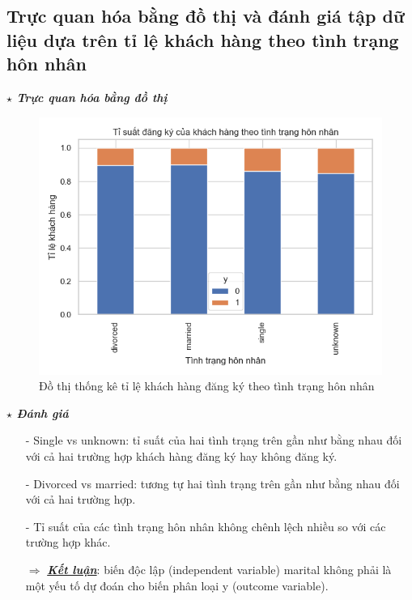\documentclass{report}
\begin{document}
        \pagebreak
    
        \subsection{Trực quan hóa bằng đồ thị và đánh giá tập dữ liệu dựa trên tỉ lệ khách hàng theo tình trạng hôn nhân}
            \fontsize{13}{10}\selectfont \textbf{$\star$\textit{ Trực quan hóa bằng đồ thị}}
                \begin{figure}[htp]
                    \centering
                    \includegraphics[scale = 0.8]{image/frequency_mariral.png}
                    \caption{Đồ thị thống kê tỉ lệ khách hàng đăng ký theo tình trạng hôn nhân}
                \end{figure}
            
            \fontsize{13}{10}\selectfont \textbf{$\star$\textit{ Đánh giá}}
                \begin{enumerate}
                    \item [- ] Single vs unknown: tỉ suất của hai tình trạng trên gần như bằng nhau đối với cả hai trường hợp khách hàng đăng ký hay không đăng ký.
                    \item [- ] Divorced vs married: tương tự hai tình trạng trên gần như bằng nhau đối với cả hai trường hợp.
                    \item [- ] Tỉ suất của các tình trạng hôn nhân không chênh lệch nhiều so với các trường hợp khác.
                    \item [$\Rightarrow$] \textbf{\underline{\textit{Kết luận}}}: biến độc lập (independent variable) marital không phải là một yếu tố dự đoán cho biến phân loại y (outcome variable).
                \end{enumerate}
                 
\end{document}
